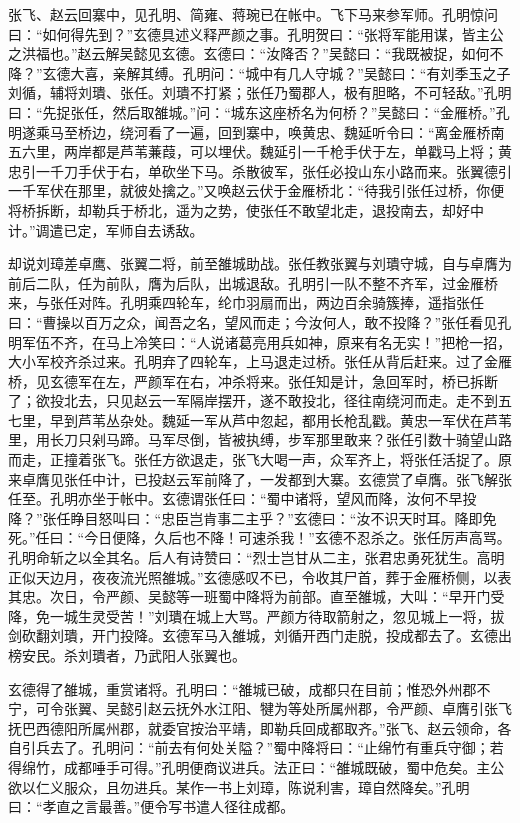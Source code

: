 张飞、赵云回寨中，见孔明、简雍、蒋琬已在帐中。飞下马来参军师。孔明惊问曰：“如何得先到？”玄德具述义释严颜之事。孔明贺曰：“张将军能用谋，皆主公之洪福也。”赵云解吴懿见玄德。玄德曰：“汝降否？”吴懿曰：“我既被捉，如何不降？”玄德大喜，亲解其缚。孔明问：“城中有几人守城？”吴懿曰：“有刘季玉之子刘循，辅将刘璝、张任。刘璝不打紧；张任乃蜀郡人，极有胆略，不可轻敌。”孔明曰：“先捉张任，然后取雒城。”问：“城东这座桥名为何桥？”吴懿曰：“金雁桥。”孔明遂乘马至桥边，绕河看了一遍，回到寨中，唤黄忠、魏延听令曰：“离金雁桥南五六里，两岸都是芦苇蒹葭，可以埋伏。魏延引一千枪手伏于左，单戳马上将；黄忠引一千刀手伏于右，单砍坐下马。杀散彼军，张任必投山东小路而来。张翼德引一千军伏在那里，就彼处擒之。”又唤赵云伏于金雁桥北：“待我引张任过桥，你便将桥拆断，却勒兵于桥北，遥为之势，使张任不敢望北走，退投南去，却好中计。”调遣已定，军师自去诱敌。

却说刘璋差卓鹰、张翼二将，前至雒城助战。张任教张翼与刘璝守城，自与卓膺为前后二队，任为前队，膺为后队，出城退敌。孔明引一队不整不齐军，过金雁桥来，与张任对阵。孔明乘四轮车，纶巾羽扇而出，两边百余骑簇捧，遥指张任曰：“曹操以百万之众，闻吾之名，望风而走；今汝何人，敢不投降？”张任看见孔明军伍不齐，在马上冷笑曰：“人说诸葛亮用兵如神，原来有名无实！”把枪一招，大小军校齐杀过来。孔明弃了四轮车，上马退走过桥。张任从背后赶来。过了金雁桥，见玄德军在左，严颜军在右，冲杀将来。张任知是计，急回军时，桥已拆断了；欲投北去，只见赵云一军隔岸摆开，遂不敢投北，径往南绕河而走。走不到五七里，早到芦苇丛杂处。魏延一军从芦中忽起，都用长枪乱戳。黄忠一军伏在芦苇里，用长刀只剁马蹄。马军尽倒，皆被执缚，步军那里敢来？张任引数十骑望山路而走，正撞着张飞。张任方欲退走，张飞大喝一声，众军齐上，将张任活捉了。原来卓膺见张任中计，已投赵云军前降了，一发都到大寨。玄德赏了卓膺。张飞解张任至。孔明亦坐于帐中。玄德谓张任曰：“蜀中诸将，望风而降，汝何不早投降？”张任睁目怒叫曰：“忠臣岂肯事二主乎？”玄德曰：“汝不识天时耳。降即免死。”任曰：“今日便降，久后也不降！可速杀我！”玄德不忍杀之。张任厉声高骂。孔明命斩之以全其名。后人有诗赞曰：“烈士岂甘从二主，张君忠勇死犹生。高明正似天边月，夜夜流光照雒城。”玄德感叹不已，令收其尸首，葬于金雁桥侧，以表其忠。次日，令严颜、吴懿等一班蜀中降将为前部。直至雒城，大叫：“早开门受降，免一城生灵受苦！”刘璝在城上大骂。严颜方待取箭射之，忽见城上一将，拔剑砍翻刘璝，开门投降。玄德军马入雒城，刘循开西门走脱，投成都去了。玄德出榜安民。杀刘璝者，乃武阳人张翼也。

玄德得了雒城，重赏诸将。孔明曰：“雒城已破，成都只在目前；惟恐外州郡不宁，可令张翼、吴懿引赵云抚外水江阳、犍为等处所属州郡，令严颜、卓膺引张飞抚巴西德阳所属州郡，就委官按治平靖，即勒兵回成都取齐。”张飞、赵云领命，各自引兵去了。孔明问：“前去有何处关隘？”蜀中降将曰：“止绵竹有重兵守御；若得绵竹，成都唾手可得。”孔明便商议进兵。法正曰：“雒城既破，蜀中危矣。主公欲以仁义服众，且勿进兵。某作一书上刘璋，陈说利害，璋自然降矣。”孔明曰：“孝直之言最善。”便令写书遣人径往成都。

